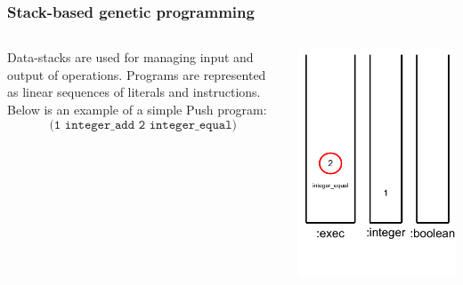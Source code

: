 \documentclass{beamer}
\newcommand{\linespace}{\vskip 0.25cm}
\begin{document}
\begin{frame}
	\frametitle{Stack-based genetic programming}
	\begin{columns}
		\begin{column}{0.65\textwidth}
			Data-stacks are used for managing input and output of operations.
			\linespace
			\linespace
			\linespace
			Programs are represented as linear sequences of literals and instructions. Below is an example of a simple Push program:
			\[\texttt{(1 integer\_add 2 integer\_equal)}\]
		\end{column}
		\begin{column}{0.35\textwidth}
			\includegraphics[height=.7\textheight]{Illustrations/stack_3_9.PDF}
		\end{column}
	\end{columns}
\end{frame}
\end{document}
